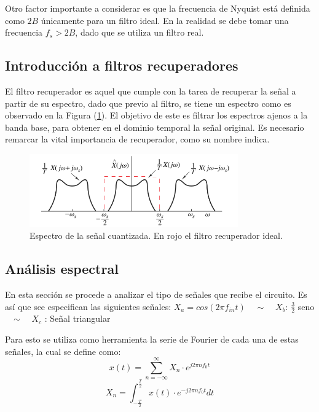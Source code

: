 Otro factor importante a considerar es que la frecuencia de Nyquist está definida como $2B$ únicamente para un filtro ideal. En la realidad se debe tomar una frecuencia $f_s>2B$, dado que se utiliza un filtro real.


\subsection{Introducción a filtros recuperadores}
El filtro recuperador es aquel que cumple con la tarea de recuperar la señal a partir de su espectro, dado que previo al filtro, se tiene un espectro como es observado en la Figura (\ref{fig:recuperador}). El objetivo de este es filtrar los espectros ajenos a la banda base, para obtener en el dominio temporal la señal original. Es necesario remarcar la vital importancia de recuperador, como su nombre indica.
\begin{figure}[H]
	\centering
	\includegraphics[width=0.8\textwidth]{ImagenesEjercicio2/recuperador.PNG}
\caption{Espectro de la señal cuantizada. En rojo el filtro recuperador ideal.}
	\label{fig:recuperador}
\end{figure}

\subsection{Análisis espectral}
En esta sección se procede a analizar el tipo de señales que recibe el circuito. Es así que see especifican las siguientes señales:
{\center
$X_a = cos(2 \pi f_{in} t)$ \ \ $\sim$  \ \
$X_b$: $\frac{3}{2}$ seno \  \ $\sim$ \ \
$X_c$ : Señal triangular \\
}

Para esto se utiliza como herramienta la serie de Fourier de cada una de estas señales, la cual se define como:
\begin{equation*}
x(t) = \sum_{n=-\infty}^{\infty} X_n \cdot e^{j2\pi n f_0t}
\end{equation*}
\begin{equation*}
X_n= \int_{-\frac{T}{2}}^\frac{T}{2} x(t) \cdot e^{-j2\pi n f_0t} dt
\end{equation*}

